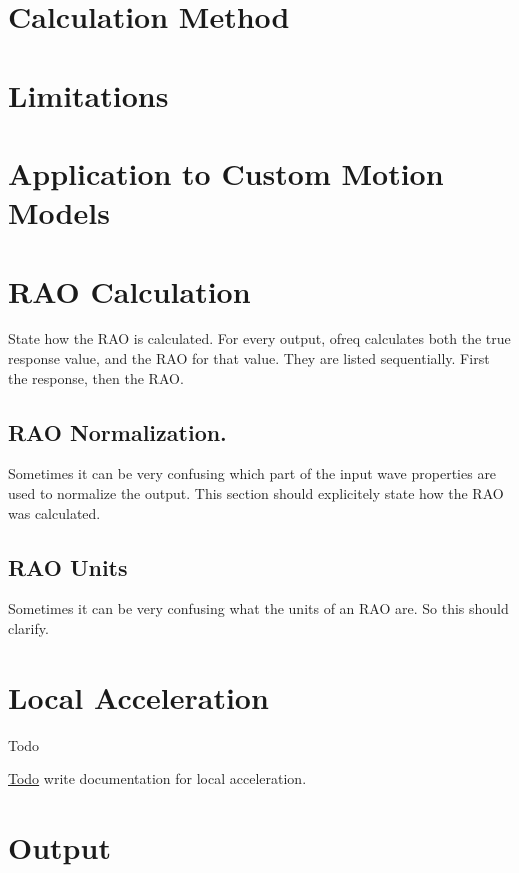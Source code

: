 \section*{Calculation Method}

\section*{Limitations}

\section*{Application to Custom Motion Models}

\section*{R\-A\-O Calculation}

State how the R\-A\-O is calculated. For every output, ofreq calculates both the true response value, and the R\-A\-O for that value. They are listed sequentially. First the response, then the R\-A\-O.

\subsection*{R\-A\-O Normalization.}

Sometimes it can be very confusing which part of the input wave properties are used to normalize the output. This section should explicitely state how the R\-A\-O was calculated.

\subsection*{R\-A\-O Units}

Sometimes it can be very confusing what the units of an R\-A\-O are. So this should clarify. \hypertarget{local_acceleration}{}\section{Local Acceleration}\label{local_acceleration}
\begin{DoxyRefDesc}{Todo}
\item[\hyperlink{todo__todo000023}{Todo}]write documentation for local acceleration.\end{DoxyRefDesc}


\section*{Output}

